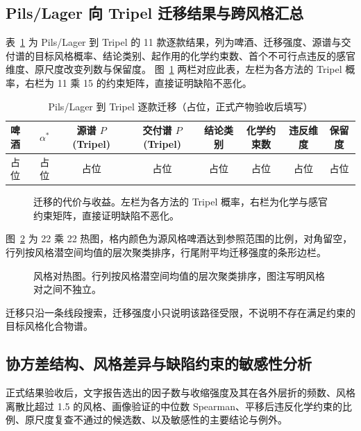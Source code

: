 \subsection{Pils/Lager 向 Tripel 迁移结果与跨风格汇总}

表~\ref{tab:q3-transfer} 为 Pils/Lager 到 Tripel 的 11 款逐款结果，列为啤酒、迁移强度、源谱与交付谱的目标风格概率、结论类别、起作用的化学约束数、首个不可行点违反的感官维度、原尺度改变列数与保留度。
图~\ref{fig:q3-transfer-fig} 两栏对应此表，左栏为各方法的 Tripel 概率，右栏为 11 乘 15 的约束矩阵，直接证明缺陷不恶化。

\begin{table}[H]
\centering\small
\caption{Pils/Lager 到 Tripel 逐款迁移（占位，正式产物验收后填写）}
\label{tab:q3-transfer}
\begin{tabular}{lccccccc}
\toprule
啤酒 & $\alpha^*$ & 源谱 $P$(Tripel) & 交付谱 $P$(Tripel) & 结论类别 & 化学约束数 & 违反维度 & 保留度 \\
\midrule
占位 & 占位 & 占位 & 占位 & 占位 & 占位 & 占位 & 占位 \\
\bottomrule
\end{tabular}
\end{table}

\begin{figure}[H]\centering
{}
\caption{迁移的代价与收益。左栏为各方法的 Tripel 概率，右栏为化学与感官约束矩阵，直接证明缺陷不恶化。}
\label{fig:q3-transfer-fig}
\end{figure}

图~\ref{fig:q3-pairs} 为 22 乘 22 热图，格内颜色为源风格啤酒达到参照范围的比例，对角留空，行列按风格潜空间均值的层次聚类排序，行尾附平均迁移强度的条形边栏。

\begin{figure}[H]\centering
{}
\caption{风格对热图。行列按风格潜空间均值的层次聚类排序，图注写明风格对之间不独立。}
\label{fig:q3-pairs}
\end{figure}

迁移只沿一条线段搜索，迁移强度小只说明该路径受限，不说明不存在满足约束的目标风格化合物谱。

\subsection{协方差结构、风格差异与缺陷约束的敏感性分析}

正式结果验收后，文字报告选出的因子数与收缩强度及其在各外层折的频数、风格离散比超过 1.5 的风格、画像验证的中位数 Spearman、平移后违反化学约束的比例、原尺度复查不通过的候选数、以及敏感性的主要结论与例外。
